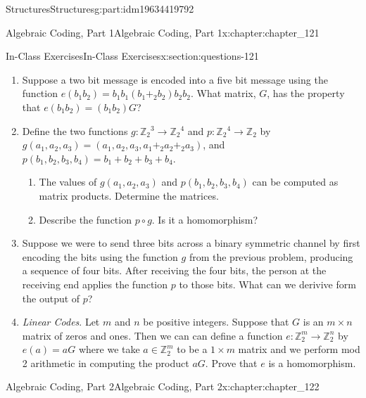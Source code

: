 \documentclass[oneside,10pt,]{book}
\numberwithin{equation}{section}
\begin{document}
\begin{partptx}{Structures}{}{Structures}{}{}{g:part:idm19634419792}
\begin{chapterptx}{Algebraic Coding, Part 1}{}{Algebraic Coding, Part 1}{}{}{x:chapter:chapter_121}
\typeout{************************************************}
%
\begin{sectionptx}{In-Class Exercises}{}{In-Class Exercises}{}{}{x:section:questions-121}
%
\begin{enumerate}[label=\arabic*.]
\item{}Suppose a two bit message is encoded into a five bit message using the function \(e(b_{1}b_{2})=b_{1}b_{1}(b_{1}+_2 b_{2})b_{2}b_{2}\).  What matrix, \(G\), has the property that \(e(b_{1}b_{2})=(b_{1} b_{2}) G\)?%
\item{}Define the two functions  \(g:\mathbb{Z}_2{}^3\rightarrow  \mathbb{Z}_2{}^4\)  and \(p:\mathbb{Z}_2{}^4\to \mathbb{Z}_2\) by \(g(a_1,a_2,a_3) = (a_1,a_2,a_3 ,a_1+_2 a_2+_2a_3)\), and \(p(b_1,b_2,b_3,b_4)=b_1+b_2+b_3+b_4\).%
\begin{enumerate}[label=(\alph*)]
\item{}The values of \(g(a_1,a_2,a_3)\) and \(p(b_1,b_2,b_3,b_4)\) can be computed as matrix products.  Determine the matrices.%
\item{}Describe the function \(p \circ g\). Is it a homomorphism?%
\end{enumerate}
%
\item{}Suppose we were to send three bits across a binary symmetric channel by first encoding the bits using the function \(g\) from the previous problem, producing a sequence of four bits.   After receiving the four bits, the person at the receiving end applies the function \(p\) to those bits.   What can we derivive form the output of \(p\)?%
\item{}\emph{Linear Codes}.  Let \(m\) and \(n\) be positive integers.  Suppose that \(G\) is an \(m \times n\) matrix of zeros and ones.  Then we can can define a function \(e:\mathbb{Z}_2^m \rightarrow \mathbb{Z}_2^n\) by \(e(a)=a G\) where we take \(a \in \mathbb{Z}_2^m\) to be a 	\(1\times m\) matrix and we perform mod 2 arithmetic in computing the product \(a G\).  Prove that \(e\) is a homomorphism.%
\end{enumerate}
%
\end{sectionptx}
\end{chapterptx}
%
\typeout{************************************************}
\typeout{************************************************}
%
\begin{chapterptx}{Algebraic Coding, Part 2}{}{Algebraic Coding, Part 2}{}{}{x:chapter:chapter_122}
\index{}%
%
%
\typeout{************************************************}

\end{chapterptx}
\end{partptx}
\end{document}
